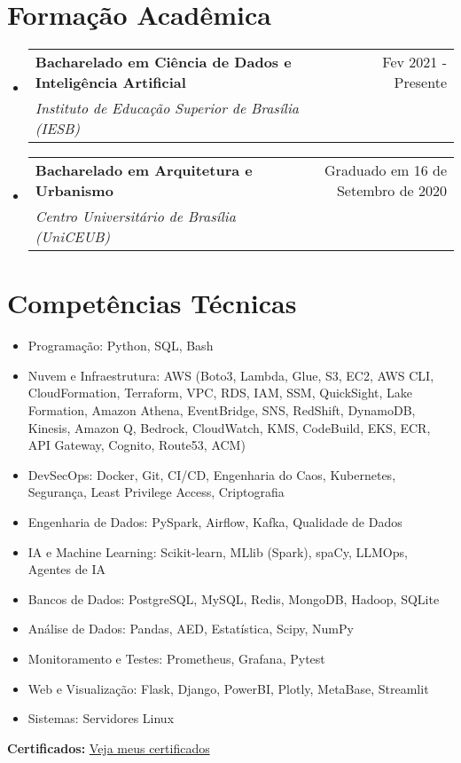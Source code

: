 \documentclass[letterpaper,11pt]{article}%
\makeatletter
\newcommand{\resumeSubheading}[4]{\vspace{-1pt}\item\begin{tabular*}{0.97\textwidth}[t]{l@{\extracolsep{\fill}}r}\textbf{#1} & #2 \\\textit{\small #3} & \textit{\small #4} \\\end{tabular*}\vspace{-8pt}}%
\newcommand{\resumeSubHeadingListStart}{\begin{itemize}[leftmargin=0.15in, label={}, itemsep=0pt, parsep=0pt]}%
\newcommand{\resumeSubHeadingListEnd}{\end{itemize}}%
\newcommand{\resumeItemListStart}{\begin{itemize}[itemsep=0pt, parsep=0pt]}%
\newcommand{\resumeItemListEnd}{\end{itemize}\vspace{-1pt}}%
\makeatother
\begin{document}
%
\section*{Formação Acadêmica}%
\label{sec:FormaoAcadmica}%
\resumeSubHeadingListStart%
\resumeSubheading{Bacharelado em Ciência de Dados e Inteligência Artificial}{Fev 2021 - Presente}{Instituto de Educação Superior de Brasília (IESB)}{}%
\resumeSubHeadingListEnd%
\resumeSubHeadingListStart%
\resumeSubheading{Bacharelado em Arquitetura e Urbanismo}{Graduado em 16 de Setembro de 2020}{Centro Universitário de Brasília (UniCEUB)}{}%
\resumeSubHeadingListEnd

%
\section*{Competências Técnicas}%
\label{sec:CompetnciasTcnicas}%
\begin{multicols}{2}%
\resumeItemListStart%
\item Programação: Python, SQL, Bash%
\item Nuvem e Infraestrutura: AWS (Boto3, Lambda, Glue, S3, EC2, AWS CLI, CloudFormation, Terraform, VPC, RDS, IAM, SSM, QuickSight, Lake Formation, Amazon Athena, EventBridge, SNS, RedShift, DynamoDB, Kinesis, Amazon Q, Bedrock, CloudWatch, KMS, CodeBuild, EKS, ECR, API Gateway, Cognito, Route53, ACM)%
\item DevSecOps: Docker, Git, CI/CD, Engenharia do Caos, Kubernetes, Segurança, Least Privilege Access, Criptografia%
\item Engenharia de Dados: PySpark, Airflow, Kafka, Qualidade de Dados%
\item IA e Machine Learning: Scikit-learn, MLlib (Spark), spaCy, LLMOps, Agentes de IA%
\item Bancos de Dados: PostgreSQL, MySQL, Redis, MongoDB, Hadoop, SQLite%
\item Análise de Dados: Pandas, AED, Estatística, Scipy, NumPy%
\item Monitoramento e Testes: Prometheus, Grafana, Pytest%
\item Web e Visualização: Flask, Django, PowerBI, Plotly, MetaBase, Streamlit%
\item Sistemas: Servidores Linux%
\resumeItemListEnd%
\end{multicols}%
\vspace{0.5em}

%
\textbf{Certificados:} \href{https://robertomdiniz.s3.amazonaws.com/accomplishments.html}{Veja meus certificados}%
\end{document}
